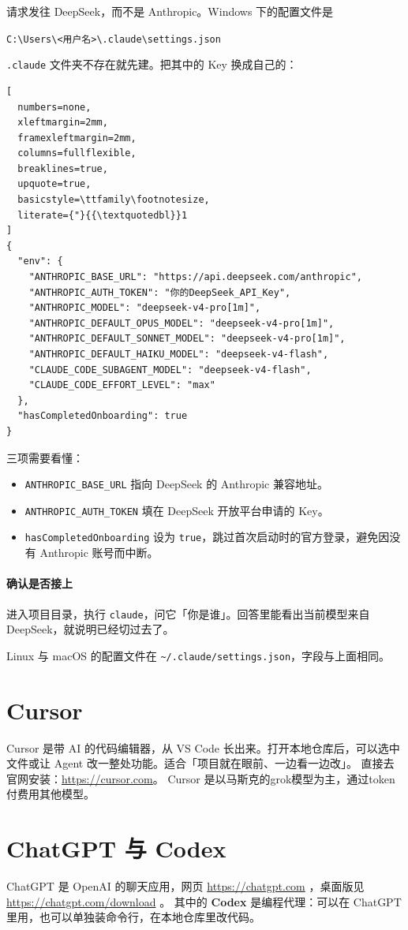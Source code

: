 请求发往 DeepSeek，而不是 Anthropic。Windows 下的配置文件是
\begin{center}
\verb|C:\Users\<用户名>\.claude\settings.json|
\end{center}
\verb|.claude| 文件夹不存在就先建。把其中的 Key 换成自己的：
\begin{lstlisting}[
  numbers=none,
  xleftmargin=2mm,
  framexleftmargin=2mm,
  columns=fullflexible,
  breaklines=true,
  upquote=true,
  basicstyle=\ttfamily\footnotesize,
  literate={"}{{\textquotedbl}}1
]
{
  "env": {
    "ANTHROPIC_BASE_URL": "https://api.deepseek.com/anthropic",
    "ANTHROPIC_AUTH_TOKEN": "你的DeepSeek_API_Key",
    "ANTHROPIC_MODEL": "deepseek-v4-pro[1m]",
    "ANTHROPIC_DEFAULT_OPUS_MODEL": "deepseek-v4-pro[1m]",
    "ANTHROPIC_DEFAULT_SONNET_MODEL": "deepseek-v4-pro[1m]",
    "ANTHROPIC_DEFAULT_HAIKU_MODEL": "deepseek-v4-flash",
    "CLAUDE_CODE_SUBAGENT_MODEL": "deepseek-v4-flash",
    "CLAUDE_CODE_EFFORT_LEVEL": "max"
  },
  "hasCompletedOnboarding": true
}
\end{lstlisting}
三项需要看懂：
\begin{itemize}
\item \verb|ANTHROPIC_BASE_URL| 指向 DeepSeek 的 Anthropic 兼容地址。
\item \verb|ANTHROPIC_AUTH_TOKEN| 填在 DeepSeek 开放平台申请的 Key。
\item \verb|hasCompletedOnboarding| 设为 \verb|true|，跳过首次启动时的官方登录，避免因没有 Anthropic 账号而中断。
\end{itemize}

\paragraph{确认是否接上}
进入项目目录，执行 \verb|claude|，问它「你是谁」。回答里能看出当前模型来自 DeepSeek，就说明已经切过去了。

Linux 与 macOS 的配置文件在 \verb|~/.claude/settings.json|，字段与上面相同。


\section{Cursor}
Cursor 是带 AI 的代码编辑器，从 VS Code 长出来。打开本地仓库后，可以选中文件或让 Agent 改一整处功能。适合「项目就在眼前、一边看一边改」。 直接去官网安装：\url{https://cursor.com}。 Cursor 是以马斯克的grok模型为主，通过token付费用其他模型。



\section{ChatGPT 与 Codex}
ChatGPT 是 OpenAI 的聊天应用，网页 \url{https://chatgpt.com} ，桌面版见 \url{https://chatgpt.com/download} 。
其中的 \textbf{Codex} 是编程代理：可以在 ChatGPT 里用，也可以单独装命令行，在本地仓库里改代码。



